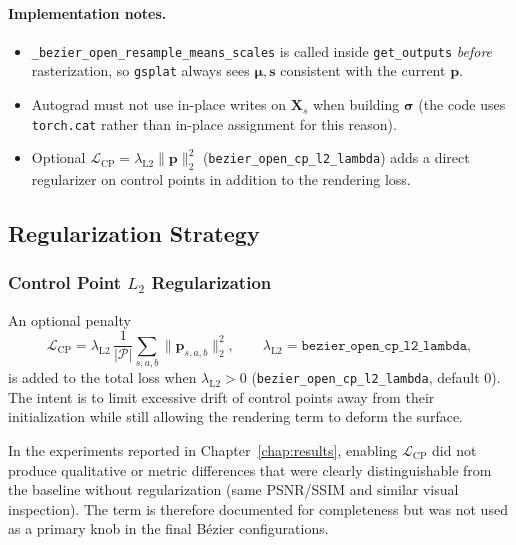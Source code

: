 \documentclass{report}
\begin{document}
\paragraph{Implementation notes.}
\begin{itemize}
    \item \texttt{\_bezier\_open\_resample\_means\_scales} is called inside \texttt{get\_outputs} \emph{before} rasterization, so \texttt{gsplat} always sees $\boldsymbol{\mu},\mathbf{s}$ consistent with the current $\mathbf{p}$.
    \item Autograd must not use in-place writes on $\mathbf{X}_s$ when building $\boldsymbol{\sigma}$ (the code uses \texttt{torch.cat} rather than in-place assignment for this reason).
    \item Optional $\mathcal{L}_{\mathrm{CP}}=\lambda_{\mathrm{L2}}\|\mathbf{p}\|_2^2$ (\texttt{bezier\_open\_cp\_l2\_lambda}) adds a direct regularizer on control points in addition to the rendering loss.
\end{itemize}

\subsection{Regularization Strategy}
\label{subsec:bezier_regularization}

\subsubsection{Control Point $L_2$ Regularization}
\label{subsubsec:cp_l2}

An optional penalty
\begin{equation}
\mathcal{L}_{\mathrm{CP}}
=\lambda_{\mathrm{L2}}\,\frac{1}{|\mathcal{P}|}\sum_{s,a,b}\|\mathbf{p}_{s,a,b}\|_2^2,
\qquad
\lambda_{\mathrm{L2}}=\texttt{bezier\_open\_cp\_l2\_lambda},
\label{eq:cp_l2}
\end{equation}
is added to the total loss when $\lambda_{\mathrm{L2}}>0$ (\texttt{bezier\_open\_cp\_l2\_lambda}, default $0$). The intent is to limit excessive drift of control points away from their initialization while still allowing the rendering term to deform the surface.

In the experiments reported in Chapter~\ref{chap:results}, enabling $\mathcal{L}_{\mathrm{CP}}$ did not produce qualitative or metric differences that were clearly distinguishable from the baseline without regularization (same PSNR/SSIM and similar visual inspection). The term is therefore documented for completeness but was not used as a primary knob in the final B\'ezier configurations.
\end{document}

